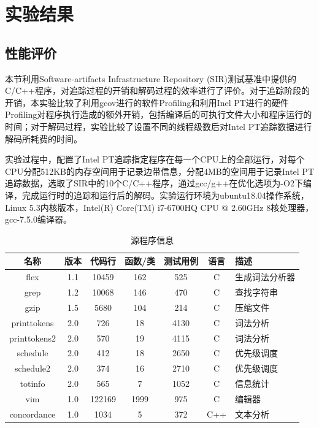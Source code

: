 
\chapter{实验结果}
\section{性能评价}
本节利用Software-artifacts Infrastructure Repository (SIR)测试基准中提供的C/C++程序，对追踪过程的开销和解码过程的效率进行了评价。对于追踪阶段的开销，本实验比较了利用gcov进行的软件Profiling和利用Inel PT进行的硬件Profiling对程序执行造成的额外开销，包括编译后的可执行文件大小和程序运行的时间；对于解码过程，实验比较了设置不同的线程级数后对Intel PT追踪数据进行解码所耗费的时间。

实验过程中，配置了Intel PT追踪指定程序在每一个CPU上的全部运行，对每个CPU分配512KB的内存空间用于记录边带信息，分配4MB的空间用于记录Intel PT追踪数据，选取了SIR中的10个C/C++程序，通过gcc/g++在优化选项为-O2下编译，完成运行时的追踪和运行后的解码。实验运行环境为ubuntu18.04操作系统，Linux 5.3内核版本，Intel(R) Core(TM) i7-6700HQ CPU @ 2.60GHz 8核处理器，gcc-7.5.0编译器。

\begin{table}[ht]
  \centering
  \caption{源程序信息}
  \label{tab:7}
  \begin{tabular}{c|c|c|c|c|c|p{3cm}}
    \hline
    名称& 版本& 代码行& 函数/类& 测试用例& 语言& 描述\\ \hline
    flex& 1.1& 10459& 162& 525& C& 生成词法分析器\\ \hline
    grep& 1.2& 10068& 146& 470& C& 查找字符串\\ \hline
    gzip& 1.5& 5680& 104& 214& C& 压缩文件\\ \hline
    printtokens& 2.0& 726& 18& 4130& C& 词法分析\\ \hline
    printtokens2& 2.0& 570& 19& 4115& C& 词法分析\\ \hline
    schedule& 2.0& 412& 18& 2650& C& 优先级调度\\ \hline
    schedule2& 2.0& 374& 16& 2710& C& 优先级调度\\ \hline
    totinfo& 2.0& 565& 7& 1052& C& 信息统计\\ \hline
    vim& 1.0& 122169& 1999& 975& C& 编辑器\\ \hline
    concordance& 1.0& 1034& 5& 372& C++& 文本分析\\ \hline   
  \end{tabular}
\end{table}

